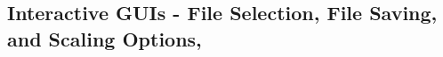 \clearpage










\subsection{Interactive GUIs - File Selection, File Saving, and Scaling
  Options, \etc{}} 
\label{sec:interactive}

